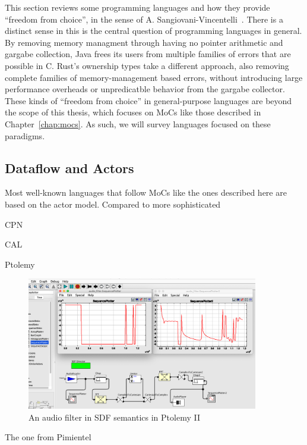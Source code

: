 This section reviews some programming languages and how they provide ``freedom from choice'', in the sense of A. Sangiovani-Vincentelli~\cite{lee2019freedom}.
There is a distinct sense in this is the central question of programming languages in general.
By removing memory managment through having no pointer arithmetic and gargabe collection, Java frees its users from multiple families of errors that are possible in C.
Rust's ownership types take a different approach, also removing complete families of memory-management based errors, without introducing large performance overheads or unpredicatble behavior from the gargabe collector.
These kinds of ``freedom from choice'' in general-purpose languages are beyond the scope of this thesis, which focuses on \acp{MoC} like those described in Chapter~\ref{chap:mocs}.
As such, we will survey languages focused on these paradigms.

\subsection{Dataflow and Actors}
\label{sec:general_dataflow_tools}


Most well-known languages that follow \acp{MoC} like the ones described here are based on the actor model.
Compared to more sophisticated

CPN

CAL

Ptolemy
\begin{figure}[t]
	\centering
	\includegraphics[width=0.9\textwidth]{figures/audio_filter_ptolemy_screenshot.png}
	\caption{An audio filter in \ac{SDF} semantics in Ptolemy II}
	\label{fig:audio_filter_ptolemy}
\end{figure}

The one from Pimientel

